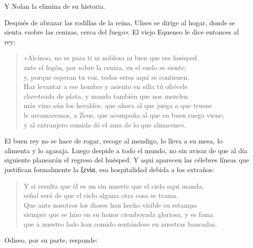 \documentclass[11pt,a4paper]{article}
\newcommand{\gr}[1]{\foreignlanguage{greek}{#1}}
\begin{document}
Y Nolan la elimina de su historia.

Después de abrazar las rodillas de la reina, Ulises se dirige al hogar, donde se sienta «sobre las cenizas, cerca del fuego».
El viejo Equeneo le dice entonces al rey:

\begin{verse}
«Alcínoo, no es para ti ni nobleza ni bien que ese huésped\\
ante el fogón, por sobre la ceniza, en el suelo se siente;\\
y, porque esperan tu voz, todos estos aquí se contienen.\\
Haz levantar a ese hombre y asiento en silla tú ofrécele\\
claveteada de plata, y manda también que nos mezclen\\
más vino aún los heraldos, que ahora al que juega a que truene\\
le arramaremos, a Zeus, que acompaña al que en buen ruego viene;\\
y al extranjero comida dé el ama de lo que almacene».
\end{verse}

El buen rey no se hace de rogar, recoge al mendigo, lo lleva a su mesa, lo alimenta y lo agasaja. Luego despide a todo el mundo, no sin avisar de que al día siguiente planearán el regreso del huésped. Y aquí aparecen las célebres líneas que justifican formalmente la \gr{ξενία}, esa hospitalidad debida a los extraños:

\begin{verse}
Y si resulta que él es un sin muerte que el cielo aquí manda,\\
señal será de que el cielo alguna otra cosa se trama.\\
Que ante nosotros los dioses han hecho visible su estampa\\
siempre que se hizo en su honor ciemboyada gloriosa, y es fama\\
que a nuestro lado han comido sentándose en nuestras bancadas.
\end{verse}

Odiseo, por su parte, responde:
\end{document}
